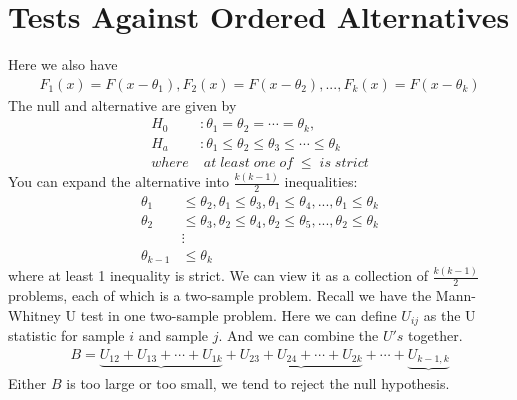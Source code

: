 \documentclass[twoside]{article}
\begin{document}
	\section{Tests Against Ordered Alternatives}
	Here we also have
	\begin{align*}
		F_1(x) = F(x - \theta_1), F_2(x) = F(x - \theta_2), ..., F_k(x) = F(x - \theta_k)
	\end{align*}
	The null and alternative are given by
	\begin{align*}
		H_0 &: \theta_1 = \theta_2 = \cdots = \theta_k, \\
		H_a &: \theta_1 \leqslant \theta_2 \leqslant \theta_3 \leqslant \cdots \leqslant \theta_k \\
		where &\; at \; least \; one \; of \; \leqslant \; is \; strict
	\end{align*}
	You can expand the alternative into $\frac{k(k-1)}{2}$ inequalities: 
	\begin{align*}
		\theta_1 &\leqslant \theta_2, \theta_1 \leqslant \theta_3, \theta_1 \leqslant \theta_4, ..., \theta_1 \leqslant \theta_k \\
		\theta_2 &\leqslant \theta_3, \theta_2 \leqslant \theta_4, \theta_2 \leqslant \theta_5, ..., \theta_2 \leqslant \theta_k \\
		&\vdots \\
		\theta_{k-1} &\leqslant \theta_k
	\end{align*}
	where at least 1 inequality is strict. We can view it as a collection of $\frac{k(k-1)}{2}$ problems, each of which is a two-sample problem. Recall we have the Mann-Whitney U test in one two-sample problem. Here we can define $U_{ij}$ as the U statistic for sample $i$ and sample $j$. And we can combine the $U's$ together. 
	\begin{align*}
		B = \underbrace{U_{12} + U_{13} + \cdots + U_{1k}} + \underbrace{U_{23} + U_{24} + \cdots + U_{2k}} + \cdots + \underbrace{U_{k-1, k}}
	\end{align*}
	Either $B$ is too large or too small, we tend to reject the null hypothesis. 
	
\end{document}
